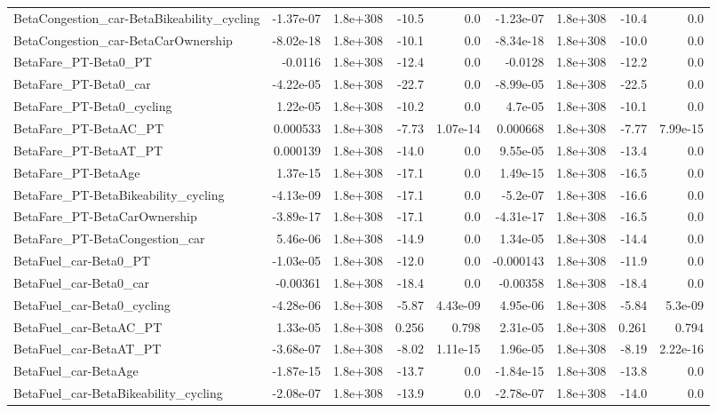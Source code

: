 \begin{tabular}{lrrrrrrrr}
BetaCongestion_car-BetaBikeability_cycling & -1.37e-07 & 1.8e+308 & -10.5 & 0.0 & -1.23e-07 & 1.8e+308 & -10.4 & 0.0 \\
BetaCongestion_car-BetaCarOwnership & -8.02e-18 & 1.8e+308 & -10.1 & 0.0 & -8.34e-18 & 1.8e+308 & -10.0 & 0.0 \\
BetaFare_PT-Beta0_PT & -0.0116 & 1.8e+308 & -12.4 & 0.0 & -0.0128 & 1.8e+308 & -12.2 & 0.0 \\
BetaFare_PT-Beta0_car & -4.22e-05 & 1.8e+308 & -22.7 & 0.0 & -8.99e-05 & 1.8e+308 & -22.5 & 0.0 \\
BetaFare_PT-Beta0_cycling & 1.22e-05 & 1.8e+308 & -10.2 & 0.0 & 4.7e-05 & 1.8e+308 & -10.1 & 0.0 \\
BetaFare_PT-BetaAC_PT & 0.000533 & 1.8e+308 & -7.73 & 1.07e-14 & 0.000668 & 1.8e+308 & -7.77 & 7.99e-15 \\
BetaFare_PT-BetaAT_PT & 0.000139 & 1.8e+308 & -14.0 & 0.0 & 9.55e-05 & 1.8e+308 & -13.4 & 0.0 \\
BetaFare_PT-BetaAge & 1.37e-15 & 1.8e+308 & -17.1 & 0.0 & 1.49e-15 & 1.8e+308 & -16.5 & 0.0 \\
BetaFare_PT-BetaBikeability_cycling & -4.13e-09 & 1.8e+308 & -17.1 & 0.0 & -5.2e-07 & 1.8e+308 & -16.6 & 0.0 \\
BetaFare_PT-BetaCarOwnership & -3.89e-17 & 1.8e+308 & -17.1 & 0.0 & -4.31e-17 & 1.8e+308 & -16.5 & 0.0 \\
BetaFare_PT-BetaCongestion_car & 5.46e-06 & 1.8e+308 & -14.9 & 0.0 & 1.34e-05 & 1.8e+308 & -14.4 & 0.0 \\
BetaFuel_car-Beta0_PT & -1.03e-05 & 1.8e+308 & -12.0 & 0.0 & -0.000143 & 1.8e+308 & -11.9 & 0.0 \\
BetaFuel_car-Beta0_car & -0.00361 & 1.8e+308 & -18.4 & 0.0 & -0.00358 & 1.8e+308 & -18.4 & 0.0 \\
BetaFuel_car-Beta0_cycling & -4.28e-06 & 1.8e+308 & -5.87 & 4.43e-09 & 4.95e-06 & 1.8e+308 & -5.84 & 5.3e-09 \\
BetaFuel_car-BetaAC_PT & 1.33e-05 & 1.8e+308 & 0.256 & 0.798 & 2.31e-05 & 1.8e+308 & 0.261 & 0.794 \\
BetaFuel_car-BetaAT_PT & -3.68e-07 & 1.8e+308 & -8.02 & 1.11e-15 & 1.96e-05 & 1.8e+308 & -8.19 & 2.22e-16 \\
BetaFuel_car-BetaAge & -1.87e-15 & 1.8e+308 & -13.7 & 0.0 & -1.84e-15 & 1.8e+308 & -13.8 & 0.0 \\
BetaFuel_car-BetaBikeability_cycling & -2.08e-07 & 1.8e+308 & -13.9 & 0.0 & -2.78e-07 & 1.8e+308 & -14.0 & 0.0 \\

\end{tabular}
